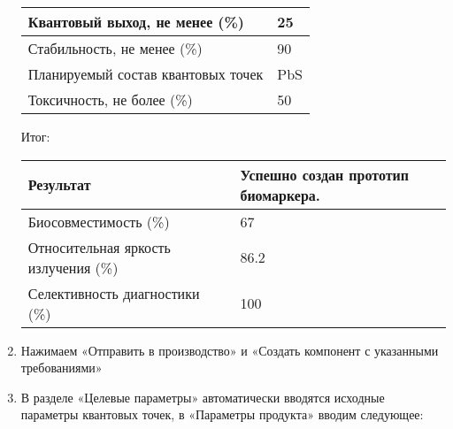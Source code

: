 \begin{enumerate}
\begin{table}[H]
\begin{center}
\begin{tabular}{|p{9cm}|p{4cm}|}
                \hline
                Квантовый выход, не менее (\%)&	25 \\
                \hline
                Стабильность, не менее (\%)	&90 \\
                \hline
                Планируемый состав квантовых точек	&PbS \\
                \hline
                Токсичность, не более (\%)&	50 \\
                \hline
            \end{tabular}
        \end{center}
    \end{table}
    
    Итог:

    \begin{table}[H]
        \begin{center}
            \begin{tabular}{|p{5cm}|p{8cm}|}
                \hline
                Результат	& Успешно создан прототип биомаркера. \\
                \hline
                Биосовместимость (\%)	& 67 \\
                \hline
                Относительная яркость излучения (\%)	& 86.2 \\
                \hline
                Селективность диагностики (\%)	& 100 \\
                \hline
            \end{tabular}
        \end{center}
    \end{table}

    \item Нажимаем «Отправить в производство» и «Создать компонент с указанными требованиями»
    \item В разделе «Целевые параметры» автоматически вводятся исходные параметры квантовых точек, в «Параметры продукта» вводим следующее:
    

\end{enumerate}
